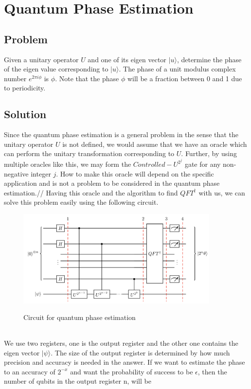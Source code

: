 \section{Quantum Phase Estimation}
\subsection{Problem}
Given a unitary operator $U$ and one of its eigen vector $|u\rangle$, determine the phase of the eigen value corresponding to $|u\rangle$. The phase of a unit modulus complex number $e^{2\pi i \phi}$ is $\phi$. Note that the phase $\phi$ will be a fraction between 0 and 1 due to periodicity.\\
\subsection{Solution}
Since the quantum phase estimation is a general problem in the sense that the unitary operator $U$ is not defined, we would assume that we have an oracle which can perform the unitary transformation corresponding to $U$. Further, by using multiple oracles like this, we may form the $Controlled-U^{2^j}$ gate for any non-negative integer $j$. How to make this oracle will depend on the specific application and is not a problem to be considered in the quantum phase estimation.//
Having this oracle and the algorithm to find $QFT^\dagger$ with us, we can solve this problem easily using the following circuit.
\begin{figure}[h]
\centering
\includegraphics[width=0.9\textwidth]{images/phase.png}
\label{phase}
\caption{Circuit for quantum phase estimation}
\end{figure}
\\We use two registers, one is the output register and the other one contains the eigen vector $|\psi \rangle$. The  size of the output register is determined by how much precision and accuracy is needed in the answer. If we want to estimate the phase to an accuracy of $2^{-x}$ and want the probability of success to be $\epsilon$, then the number of qubits in the output register n, will be
